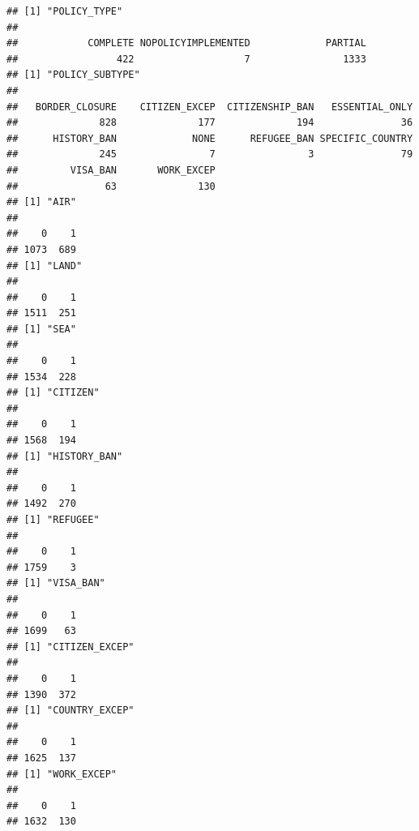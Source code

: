 \documentclass[]{article}
\newenvironment{Shaded}{\begin{snugshade}}{\end{snugshade}}
\newcommand{\CommentTok}[1]{\textcolor[rgb]{0.56,0.35,0.01}{\textit{#1}}}
\newcommand{\ControlFlowTok}[1]{\textcolor[rgb]{0.13,0.29,0.53}{\textbf{#1}}}
\newcommand{\DecValTok}[1]{\textcolor[rgb]{0.00,0.00,0.81}{#1}}
\newcommand{\KeywordTok}[1]{\textcolor[rgb]{0.13,0.29,0.53}{\textbf{#1}}}
\newcommand{\NormalTok}[1]{#1}
\newcommand{\OperatorTok}[1]{\textcolor[rgb]{0.81,0.36,0.00}{\textbf{#1}}}
\newcommand{\StringTok}[1]{\textcolor[rgb]{0.31,0.60,0.02}{#1}}
\begin{document}
\begin{Shaded}
\end{Shaded}

\begin{verbatim}
## [1] "POLICY_TYPE"
## 
##            COMPLETE NOPOLICYIMPLEMENTED             PARTIAL 
##                 422                   7                1333 
## [1] "POLICY_SUBTYPE"
## 
##   BORDER_CLOSURE    CITIZEN_EXCEP  CITIZENSHIP_BAN   ESSENTIAL_ONLY 
##              828              177              194               36 
##      HISTORY_BAN             NONE      REFUGEE_BAN SPECIFIC_COUNTRY 
##              245                7                3               79 
##         VISA_BAN       WORK_EXCEP 
##               63              130 
## [1] "AIR"
## 
##    0    1 
## 1073  689 
## [1] "LAND"
## 
##    0    1 
## 1511  251 
## [1] "SEA"
## 
##    0    1 
## 1534  228 
## [1] "CITIZEN"
## 
##    0    1 
## 1568  194 
## [1] "HISTORY_BAN"
## 
##    0    1 
## 1492  270 
## [1] "REFUGEE"
## 
##    0    1 
## 1759    3 
## [1] "VISA_BAN"
## 
##    0    1 
## 1699   63 
## [1] "CITIZEN_EXCEP"
## 
##    0    1 
## 1390  372 
## [1] "COUNTRY_EXCEP"
## 
##    0    1 
## 1625  137 
## [1] "WORK_EXCEP"
## 
##    0    1 
## 1632  130
\end{verbatim}
\end{document}
